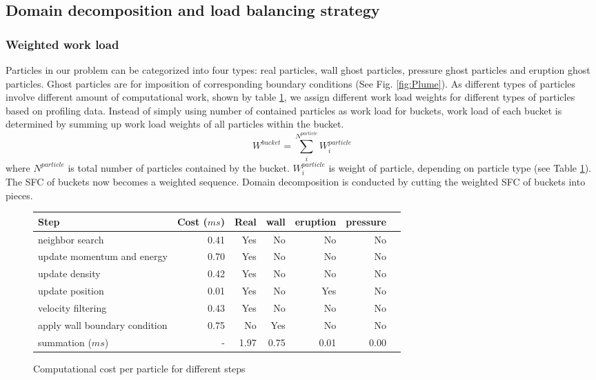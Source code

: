 \subsection{Domain decomposition and load balancing strategy}
\label{sect:load_balance}
\subsubsection{Weighted work load} \label{sec:Weighted_work_load}
Particles in our problem can be categorized into four types: real particles, wall ghost particles, pressure ghost particles and eruption ghost particles. Ghost particles are for imposition of corresponding boundary conditions (See Fig. \ref{fig:Plume}). As different types of particles involve different amount of computational work, shown by table \ref{tab:Computational_cost_steps}, we assign different work load weights for different types of particles based on profiling data. Instead of simply using number of contained particles as work load for buckets, work load of each bucket is determined by summing up work load weights of all particles within the bucket.
\begin{equation}
W^{bucket} = \sum_i^{N^{particle}} W_i^{particle}
\label{eq:work-load-bucket}
\end{equation}
where $N^{particle}$ is total number of particles contained by the bucket. $W_i^{particle}$ is weight of particle, depending on particle type (see Table \ref{tab:Computational_cost_steps}).
The SFC of buckets now becomes a weighted sequence. Domain decomposition is conducted by cutting the weighted SFC of buckets into pieces.

\begin{figure}
\centering
	  \begin{tabular}{lrrrrrr}
	    \hline
	    Step & Cost ($ms$) & Real & wall & eruption & pressure\\
	    \hline
	    neighbor search & 0.41 & Yes & No & No & No \\
	    update momentum and energy & 0.70 & Yes & No & No & No\\
	    update density & 0.42 & Yes & No & No & No \\
	    update position & 0.01 & Yes & No & Yes &  No\\
	    velocity filtering& 0.43 & Yes & No & No & No\\
	    apply wall boundary condition     & 0.75 & No & Yes & No & No\\
	    summation ($ms$) & - & 1.97 & 0.75 & 0.01 & 0.00\\
	    \hline
	  \end{tabular}
{\caption{Computational cost per particle for different steps}	}
\label{tab:Computational_cost_steps}
\end{figure}

